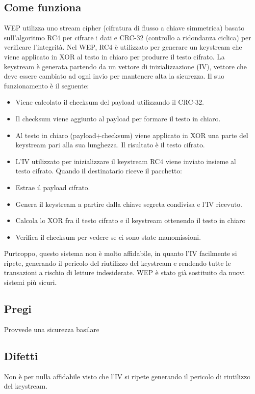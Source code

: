 \subsection{Come funziona}
WEP utilizza uno stream cipher (cifratura di flusso a chiave simmetrica) basato sull'algoritmo RC4 per cifrare i dati e CRC-32 (controllo a ridondanza ciclica) per verificare l'integrità.
Nel WEP, RC4 è utilizzato per generare un keystream che viene applicato in XOR al testo in chiaro per produrre il testo cifrato. La keystream è generata partendo da un vettore di inizializzazione (IV), vettore che deve essere cambiato ad ogni invio per mantenere alta la sicurezza.
Il suo funzionamento è il seguente:
\begin{itemize}
\item	Viene calcolato il checksum del payload utilizzando il CRC-32.
\item	Il checksum viene aggiunto al payload per formare il testo in chiaro.
\item	Al testo in chiaro (payload+checksum) viene applicato in XOR una parte del keystream pari alla sua lunghezza. Il risultato è il testo cifrato.
\item	L'IV utilizzato per inizializzare il keystream RC4 viene inviato insieme al testo cifrato.
Quando il destinatario riceve il pacchetto:
\item	Estrae il payload cifrato.
\item	Genera il keystream a partire dalla chiave segreta condivisa e l'IV ricevuto.
\item	Calcola lo XOR fra il testo cifrato e il keystream ottenendo il testo in chiaro
\item	Verifica il checksum per vedere se ci sono state manomissioni.
\end{itemize}
Purtroppo, questo sistema non è molto affidabile, in quanto l'IV facilmente si ripete, generando il pericolo del riutilizzo del keystream e rendendo tutte le transazioni a rischio di letture indesiderate. WEP è stato già sostituito da nuovi sistemi più sicuri.

\subsection{Pregi}
Provvede una sicurezza basilare
\subsection{Difetti}
Non è per nulla affidabile visto che l'IV si ripete generando il pericolo di riutilizzo del keystream.
